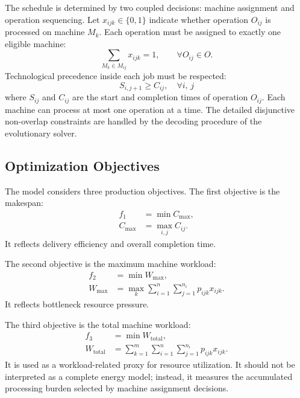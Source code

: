 \documentclass[pdflatex,iicol,Numbered,sn-basic]{sn-jnl}
\begin{document}
The schedule is determined by two coupled decisions: machine assignment and operation sequencing. Let $x_{ijk}\in\{0,1\}$ indicate whether operation $O_{ij}$ is processed on machine $M_k$. Each operation must be assigned to exactly one eligible machine:
\begin{equation}
  \sum_{M_k\in M_{ij}} x_{ijk}=1,\qquad \forall O_{ij}\in O.
\end{equation}
Technological precedence inside each job must be respected:
\begin{equation}
  S_{i,j+1}\ge C_{ij}, \quad \forall i,\, j
\end{equation}
where $S_{ij}$ and $C_{ij}$ are the start and completion times of operation $O_{ij}$. Each machine can process at most one operation at a time.
The detailed disjunctive non-overlap constraints are handled by the decoding procedure of the evolutionary solver.

\subsection{Optimization Objectives}\label{subsec:objectives}
The model considers three production objectives. The first objective is the makespan:
\begin{align}
  f_1      & =\min C_{\max},     \\
  C_{\max} & =\max_{i,j} C_{ij}.
\end{align}
It reflects delivery efficiency and overall completion time.

The second objective is the maximum machine workload:
\begin{align}
  f_2      & =\min W_{\max},                                          \\
  W_{\max} & =\max_{k} \sum_{i=1}^{n}\sum_{j=1}^{n_i} p_{ijk}x_{ijk}.
\end{align}
It reflects bottleneck resource pressure.

The third objective is the total machine workload:
\begin{align}
  f_3                & =\min W_{\mathrm{total}},                                     \\
  W_{\mathrm{total}} & =\sum_{k=1}^{m}\sum_{i=1}^{n}\sum_{j=1}^{n_i} p_{ijk}x_{ijk}.
\end{align}
It is used as a workload-related proxy for resource utilization. It should not be interpreted as a complete energy model; instead, it measures the accumulated processing burden selected by machine assignment decisions.
\end{document}
